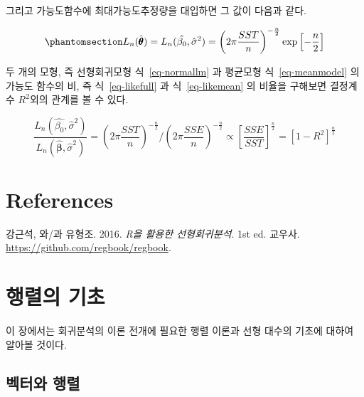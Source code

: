 \documentclass[
  11pt,
  a4paper,
  oneside]{scrbook}
\newlength{\cslhangindent}
\newenvironment{CSLReferences}[2] %
 {\begin{list}{}{%
  \setlength{\itemindent}{0pt}
  \setlength{\leftmargin}{0pt}
  \setlength{\parsep}{0pt}
  \ifodd #1
   \setlength{\leftmargin}{\cslhangindent}
   \setlength{\itemindent}{-1\cslhangindent}
  \fi
  \setlength{\itemsep}{#2\baselineskip}}}
 {\end{list}}
\theoremstyle{definition}
\theoremstyle{plain}
\theoremstyle{definition}
\theoremstyle{definition}
\theoremstyle{remark}
\begin{document}
그리고 가능도함수에 최대가능도추정량을 대입하면 그 값이 다음과 같다.

\begin{equation}\phantomsection\label{eq-likemean}{
 L_n(\hat { \pmb \theta} )  = L_n(\hat { \beta_0} ,\hat \sigma^2 ) 
 = \left (2\pi \frac{SST}{n} \right )^{-\frac{n}{2}} \exp \left [-\frac{n}{2} \right ]
}\end{equation}

두 개의 모형, 즉 선형회귀모형 식~\ref{eq-normallm} 과 평균모형
식~\ref{eq-meanmodel} 의 가능도 함수의 비, 즉 식~\ref{eq-likefull} 과
식~\ref{eq-likemean} 의 비율을 구해보면 결정계수 \(R^2\)외의 관계를 볼
수 있다.

\[  
\frac{ L_n(\hat { \beta_0} ,\hat \sigma^2 )  }{L_n(\hat { \pmb \beta} ,\hat \sigma^2 ) }
= \left (2\pi \frac{SST}{n} \right )^{-\frac{n}{2}} / \left (2\pi \frac{SSE}{n} \right )^{-\frac{n}{2}} 
\propto  \left [ \frac{SSE}{SST} \right ]^{\frac{n}{2}} = \left [ 1-R^2 \right ]^{\frac{n}{2}}  
\]


\chapter*{References}\label{references}


\label{refs}
\begin{CSLReferences}{1}{0}
강근석, 와/과 유형조. 2016. \emph{{R}을 활용한 선형회귀분석}. 1st ed.
교우사. \url{https://github.com/regbook/regbook}.

\end{CSLReferences}

\cleardoublepage
{}
{}
\appendix

\chapter{행렬의 기초}\label{uxd589uxb82cuxc758-uxae30uxcd08}

이 장에서는 회귀분석의 이론 전개에 필요한 행렬 이론과 선형 대수의 기초에
대하여 알아볼 것이다.

\section{벡터와 행렬}\label{uxbca1uxd130uxc640-uxd589uxb82c}
\end{document}
